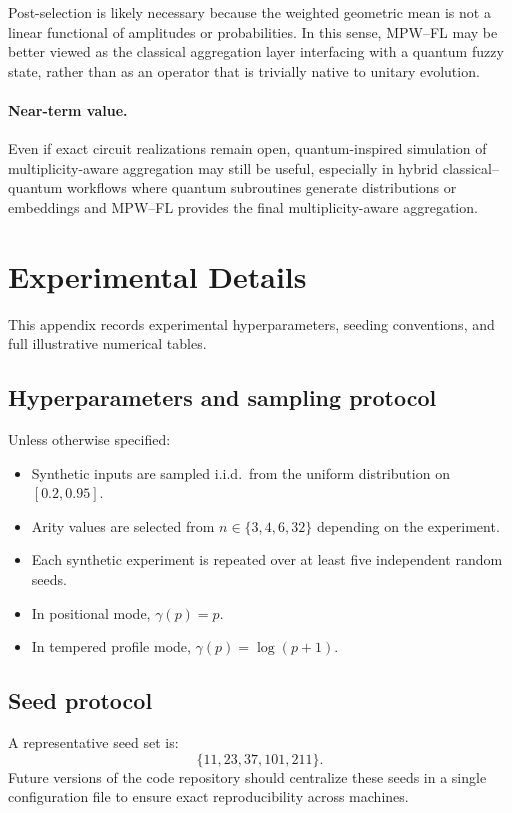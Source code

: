 \documentclass[11pt]{article}
\begin{document}
Post-selection is likely necessary because the weighted geometric mean is not a linear functional of amplitudes or probabilities. In this sense, MPW--FL may be better viewed as the classical aggregation layer interfacing with a quantum fuzzy state, rather than as an operator that is trivially native to unitary evolution.

\paragraph{Near-term value.}
Even if exact circuit realizations remain open, quantum-inspired simulation of multiplicity-aware aggregation may still be useful, especially in hybrid classical--quantum workflows where quantum subroutines generate distributions or embeddings and MPW--FL provides the final multiplicity-aware aggregation.

\section{Experimental Details}
\label{app:experimental-details}

This appendix records experimental hyperparameters, seeding conventions, and full illustrative numerical tables.

\subsection{Hyperparameters and sampling protocol}

Unless otherwise specified:
\begin{itemize}
  \item Synthetic inputs are sampled i.i.d.\ from the uniform distribution on $[0.2,0.95]$.
  \item Arity values are selected from $n\in\{3,4,6,32\}$ depending on the experiment.
  \item Each synthetic experiment is repeated over at least five independent random seeds.
  \item In positional mode, $\gamma(p)=p$.
  \item In tempered profile mode, $\gamma(p)=\log(p+1)$.
\end{itemize}

\subsection{Seed protocol}

A representative seed set is:
\[
  \{11, 23, 37, 101, 211\}.
\]
Future versions of the code repository should centralize these seeds in a single configuration file to ensure exact reproducibility across machines.
\end{document}
